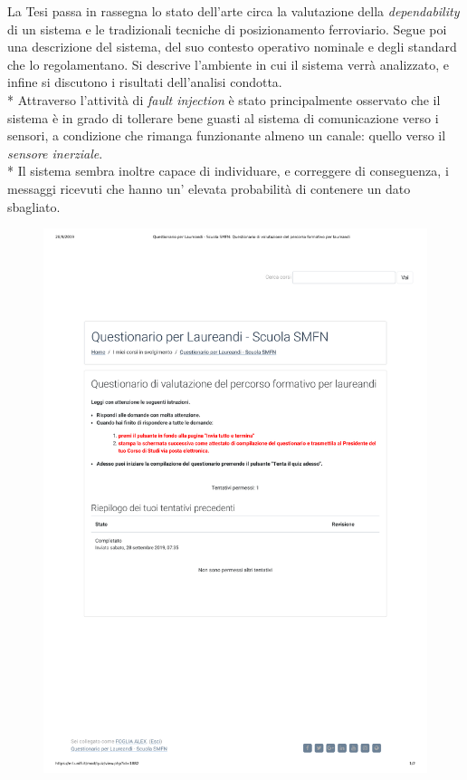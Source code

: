 \documentclass[10pt,a4paper]{article}
\begin{document}
	La Tesi passa in rassegna lo stato dell'arte circa la valutazione della \emph{dependability} di un sistema e le tradizionali tecniche di posizionamento ferroviario. Segue poi una descrizione del sistema, del suo contesto operativo nominale e degli standard che lo regolamentano. Si descrive l'ambiente in cui il sistema verr\`a analizzato, e infine si discutono i risultati dell'analisi condotta.\\*
	Attraverso l'attivit\`a di \emph{fault injection} \`e stato principalmente osservato che il sistema \`e in grado di tollerare bene guasti al sistema di comunicazione verso i sensori, a condizione che rimanga funzionante almeno un canale: quello verso il \emph{sensore inerziale}.\\*
	Il sistema sembra inoltre capace di individuare, e correggere di conseguenza, i messaggi ricevuti che hanno un' elevata probabilit\`a di contenere un dato sbagliato.
	\newpage
	\begin{figure}
		\centering
		\includegraphics[width=\linewidth]{questionario}
		\label{fig:questionario}
	\end{figure}
	
	
\end{document}
